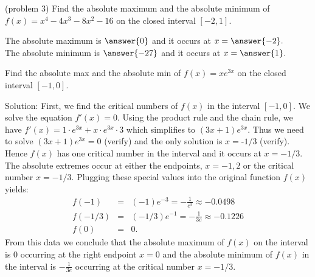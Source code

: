 \documentclass{ximera}
\begin{document}
\begin{problem}(problem 3)
Find the absolute maximum and the absolute minimum of $f(x) = x^4 - 4x^3 - 8x^2 - 16$  
on the closed interval $[-2, 1]$.

The absolute maximum is $\answer{0}$ and it occurs at $x = \answer{-2}.$
\\
The absolute minimum is $\answer{-27}$ and it occurs at $x = \answer{1}.$
\end{problem}



\begin{example}[example 4]
Find the absolute max and the absolute min of $f(x) = xe^{3x}$ on the closed interval $[-1, 0]$.

Solution:  First, we find the critical numbers of $f(x)$ in the 
interval $[-1, 0]$.   
We solve the equation $f'(x) =0$.  
Using the product rule and the chain rule, we have $f'(x) = 1\cdot e^{3x} + x\cdot e^{3x} \cdot 3$ which simplifies to $(3x+1)e^{3x}$. 
Thus we need to solve $(3x+1)e^{3x} = 0$ (verify) and the only solution is $x=\text{-}1/3$ (verify).
Hence $f(x)$ has one critical number in the interval and it occurs at $x = -1/3$.
The absolute extremes occur at either the endpoints, $x=-1, 2$ or the critical number $x = -1/3$.  
Plugging these special values into the original function $f(x)$ yields:
\begin{eqnarray*}
f(-1) &=& (-1)e^{-3} = -\frac{1}{e^3} \approx -0.0498\\
f(-1/3) &=& (-1/3)e^{-1} = -\frac{1}{3e} \approx -0.1226\\
f(0) &=& 0.
\end{eqnarray*}
From this data we conclude that the absolute maximum of $f(x)$ on the interval is $0$ occurring 
at the right endpoint $x = 0$ and the absolute minimum of $f(x)$ in the interval is $-\frac{1}{3e}$
occurring at the critical number $x = -1/3$.
\begin{image}
\end{image}
\end{example}
\end{document}
